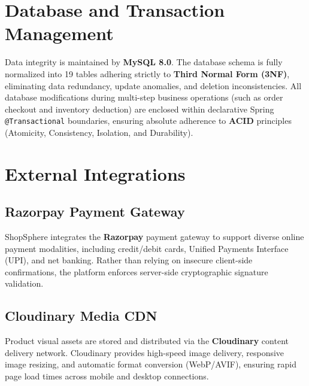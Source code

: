 \section{Database and Transaction Management}
Data integrity is maintained by \textbf{MySQL 8.0}. The database schema is fully normalized into 19 tables adhering strictly to \textbf{Third Normal Form (3NF)}, eliminating data redundancy, update anomalies, and deletion inconsistencies. All database modifications during multi-step business operations (such as order checkout and inventory deduction) are enclosed within declarative Spring \texttt{@Transactional} boundaries, ensuring absolute adherence to \textbf{ACID} principles (Atomicity, Consistency, Isolation, and Durability).

\section{External Integrations}
\subsection{Razorpay Payment Gateway}
ShopSphere integrates the \textbf{Razorpay} payment gateway to support diverse online payment modalities, including credit/debit cards, Unified Payments Interface (UPI), and net banking. Rather than relying on insecure client-side confirmations, the platform enforces server-side cryptographic signature validation.

\subsection{Cloudinary Media CDN}
Product visual assets are stored and distributed via the \textbf{Cloudinary} content delivery network. Cloudinary provides high-speed image delivery, responsive image resizing, and automatic format conversion (WebP/AVIF), ensuring rapid page load times across mobile and desktop connections.
